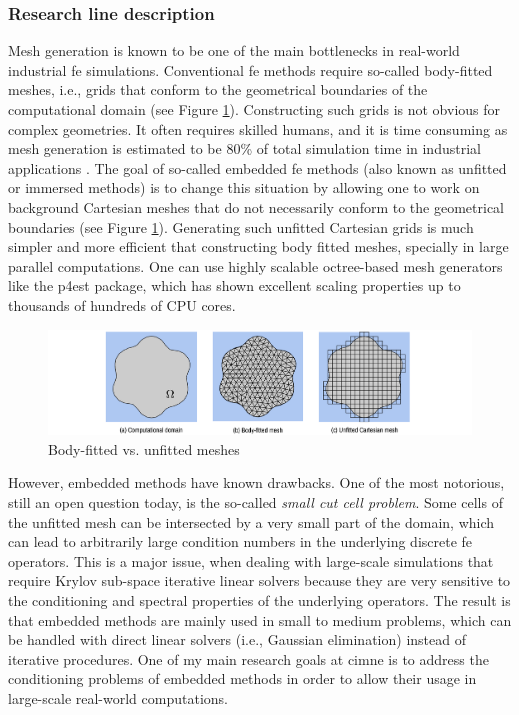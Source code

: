 \documentclass{article}
\newcommand{\bemph}[1]{#1}
\begin{document}
\subsubsection{Research line description}


Mesh generation is known to be one of the main bottlenecks in real-world industrial \ac{fe} simulations. Conventional \ac{fe} methods require so-called body-fitted meshes, i.e., grids that conform to the geometrical boundaries of the computational domain (see Figure \ref{fig:fitted-vs-unfitted}). Constructing such grids is not obvious for complex geometries. It often requires skilled humans, and it is time consuming as mesh generation is estimated to be 80\% of total simulation time in industrial applications \cite{cottrell_2009}. The goal of so-called embedded \ac{fe} methods \cite{burman_2015} (also known as unfitted or immersed methods) is to change this situation by allowing one to work on background Cartesian meshes that do not necessarily conform to the geometrical boundaries (see Figure \ref{fig:fitted-vs-unfitted}). Generating such unfitted Cartesian grids is much simpler and more efficient that constructing body fitted meshes, specially in large parallel computations.  One can use highly scalable octree-based mesh generators like the p4est package, which has shown excellent scaling properties up to thousands of hundreds of CPU cores. 

\begin{figure}[ht!]
\includegraphics[width=\textwidth]{../_assets/fig1.png}
\caption{Body-fitted vs. unfitted meshes}
\label{fig:fitted-vs-unfitted}
\end{figure}


However, embedded methods have known drawbacks. One of the most notorious, still an open question today, is the so-called \emph{small cut cell problem}. Some cells of the unfitted mesh can be intersected by a very small part of the domain, which can lead to arbitrarily large condition numbers in the underlying discrete \ac{fe} operators. This is a major issue, when dealing with large-scale simulations that require Krylov sub-space iterative linear solvers  because they are very sensitive to the conditioning and spectral properties of the underlying operators. The result is that embedded methods are mainly used in small to medium problems, which can be handled with direct linear solvers (i.e., Gaussian elimination) instead of iterative procedures. \bemph{One of my main research goals at \ac{cimne} is to address the conditioning problems of embedded methods in order to allow their usage in large-scale real-world computations}.
\end{document}
